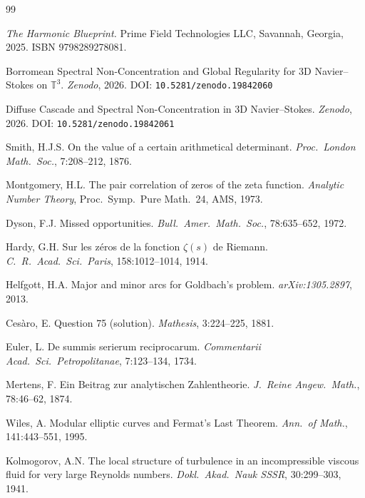\documentclass[12pt]{article}
\begin{document}
\begin{thebibliography}{99}

\textit{The Harmonic Blueprint.}
Prime Field Technologies LLC, Savannah, Georgia, 2025.
ISBN 9798289278081.

Borromean Spectral Non-Concentration and Global Regularity
for 3D Navier--Stokes on $\mathbb{T}^3$.
\textit{Zenodo}, 2026.
DOI: \texttt{10.5281/zenodo.19842060}

Diffuse Cascade and Spectral Non-Concentration in 3D
Navier--Stokes.
\textit{Zenodo}, 2026.
DOI: \texttt{10.5281/zenodo.19842061}

Smith, H.J.S.
On the value of a certain arithmetical determinant.
\textit{Proc.\ London Math.\ Soc.}, 7:208--212, 1876.

Montgomery, H.L.
The pair correlation of zeros of the zeta function.
\textit{Analytic Number Theory},
Proc.\ Symp.\ Pure Math.\ 24, AMS, 1973.

Dyson, F.J.
Missed opportunities.
\textit{Bull.\ Amer.\ Math.\ Soc.}, 78:635--652, 1972.

Hardy, G.H.
Sur les z\'{e}ros de la fonction $\zeta(s)$ de Riemann.
\textit{C.\ R.\ Acad.\ Sci.\ Paris}, 158:1012--1014, 1914.

Helfgott, H.A.
Major and minor arcs for Goldbach's problem.
\textit{arXiv:1305.2897}, 2013.

Ces\`{a}ro, E.
Question 75 (solution).
\textit{Mathesis}, 3:224--225, 1881.

Euler, L.
De summis serierum reciprocarum.
\textit{Commentarii Acad.\ Sci.\ Petropolitanae},
7:123--134, 1734.

Mertens, F.
Ein Beitrag zur analytischen Zahlentheorie.
\textit{J.\ Reine Angew.\ Math.}, 78:46--62, 1874.

Wiles, A.
Modular elliptic curves and Fermat's Last Theorem.
\textit{Ann.\ of Math.}, 141:443--551, 1995.

Kolmogorov, A.N.
The local structure of turbulence in an incompressible
viscous fluid for very large Reynolds numbers.
\textit{Dokl.\ Akad.\ Nauk SSSR}, 30:299--303, 1941.

\end{thebibliography}
\end{document}
